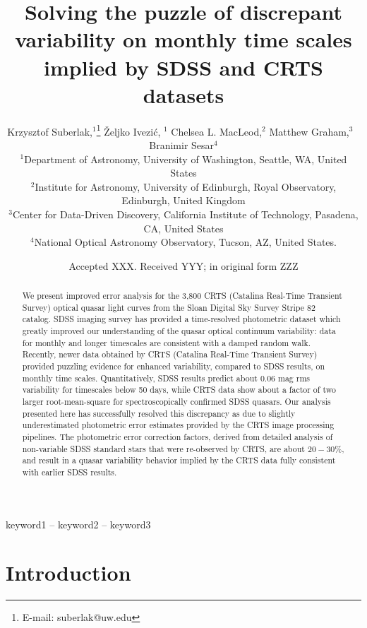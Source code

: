 \documentclass[a4paper,fleqn,usenatbib]{mnras}
\title[Quasar Variability]{Solving the puzzle of discrepant variability on monthly time scales implied by SDSS and CRTS datasets}
\author[K. Suberlak et al.]{
Krzysztof Suberlak,$^{1}$\thanks{E-mail: suberlak@uw.edu}
\v{Z}eljko Ivezi\'c, $^{1}$
Chelsea L. MacLeod,$^{2}$
Matthew Graham,$^{3}$ 
\newauthor
$\, \,  $Branimir Sesar$^{4}$
\\
$^{1}$Department of Astronomy, University of Washington, Seattle, WA, United States\\
$^{2}$Institute for Astronomy, University of Edinburgh, Royal Observatory, Edinburgh, United Kingdom\\
$^{3}$Center for Data-Driven Discovery, California Institute of Technology, Pasadena, CA, United States\\
$^{4}$National Optical Astronomy Observatory, Tucson, AZ, United States.
}
\date{Accepted XXX. Received YYY; in original form ZZZ}
\begin{document}
\label{firstpage}
\pagerange{\pageref{firstpage}--\pageref{lastpage}}
\maketitle

\begin{abstract}

We present improved error analysis for the 3,800 CRTS (Catalina Real-Time Transient Survey) optical quasar light curves from the Sloan Digital Sky Survey Stripe 82 catalog. SDSS imaging survey has provided a time-resolved photometric  dataset which greatly improved our understanding of the quasar optical continuum variability: data for monthly and longer timescales  are consistent with a damped random walk. Recently, newer data  obtained by CRTS (Catalina Real-Time Transient Survey) provided  puzzling evidence for enhanced variability, compared to SDSS results, on monthly time scales. Quantitatively, SDSS results predict  about $0.06$ mag rms variability for timescales below 50 days, while CRTS data show about a factor of two larger root-mean-square  for spectroscopically confirmed SDSS quasars. Our analysis presented here has successfully resolved this discrepancy as due to slightly underestimated photometric error estimates provided by the CRTS image processing pipelines. The photometric error correction factors, derived from detailed analysis of non-variable SDSS standard stars that were re-observed by CRTS, are about $20-30\%$, and result in a quasar variability behavior implied by the CRTS data fully consistent with earlier SDSS results.


\end{abstract}

\begin{keywords}
keyword1 -- keyword2 -- keyword3
\end{keywords}



\section{Introduction}
\label{sec:intro}
\end{document}
